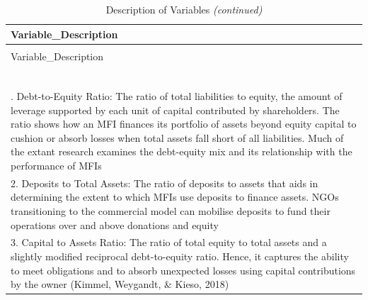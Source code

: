\documentclass[a4paper, nobind]{templates/ociamthesis}
\begin{document}
\begin{longtabu} to 
\caption{\label{tab:unnamed-chunk-180}Description of Variables}\\
\toprule
Variable\_Description\\
\midrule
\endfirsthead
\caption[]{\label{tab:unnamed-chunk-180}Description of Variables \textit{(continued)}}\\
\toprule
Variable\_Description\\
\midrule
\endhead

\endfoot
\bottomrule
{}\\
\\
\\
\\
\\
\\
. Debt-to-Equity Ratio: The ratio of total liabilities to equity, the amount of leverage supported by each unit of capital contributed by shareholders. The ratio shows how an MFI finances its portfolio of assets beyond equity capital to cushion or absorb losses when total assets fall short of all liabilities. Much of the extant research examines the debt-equity mix and its relationship with the performance of MFIs\\
2. Deposits to Total Assets: The ratio of deposits to assets that aids in determining the extent to which MFIs use deposits to finance assets. NGOs transitioning to the commercial model can mobilise deposits  to fund their operations over and above donations and equity\\
3. Capital to Assets Ratio: The ratio of total equity to total assets and a slightly modified reciprocal debt-to-equity ratio. Hence, it captures the ability to meet obligations and to absorb unexpected losses using capital contributions by the owner (Kimmel, Weygandt, \& Kieso, 2018)\\

\end{longtabu}
\end{document}
